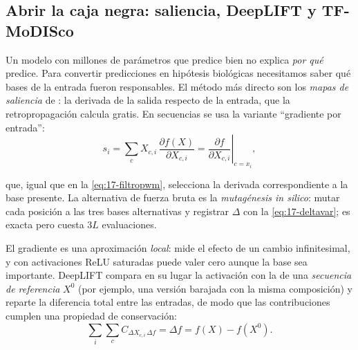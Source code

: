 \subsection{Abrir la caja negra: saliencia, DeepLIFT y TF-MoDISco}

Un modelo con millones de parámetros que predice bien no explica \emph{por qué} predice. Para convertir predicciones en hipótesis biológicas necesitamos saber qué bases de la entrada fueron responsables. El método más directo son los \emph{mapas de saliencia} de \textcite{c17-simonyan2013}: la derivada de la salida respecto de la entrada, que la retropropagación calcula gratis. En secuencias  se usa la variante ``gradiente por entrada'':
\begin{equation}\label{eq:17-saliencia}
s_i = \sum_{c} X_{c,i}\,\frac{\partial f(X)}{\partial X_{c,i}} = \left.\frac{\partial f}{\partial X_{c,i}}\right|_{c=x_i},
\end{equation}

\begin{simbolos}
\end{simbolos}

\noindent que, igual que en la \cref{eq:17-filtropwm}, selecciona la derivada correspondiente a la base presente. La alternativa de fuerza bruta es la \emph{mutagénesis in silico}: mutar cada posición a las tres bases alternativas y registrar $\Delta$ con la \cref{eq:17-deltavar}; es exacta pero cuesta $3L$ evaluaciones.

El gradiente es una aproximación \emph{local}: mide el efecto de un cambio infinitesimal, y con activaciones ReLU saturadas puede valer cero aunque la base sea importante. DeepLIFT \parencite{c17-shrikumar2017} compara en su lugar la activación con la de una \emph{secuencia de referencia} $X^0$ (por ejemplo, una versión barajada con la misma composición) y reparte la diferencia total entre las entradas, de modo que las contribuciones cumplen una propiedad de conservación:
\begin{equation}\label{eq:17-deeplift}
\sum_{i}\sum_c C_{\Delta X_{c,i}\,\Delta f} = \Delta f = f(X)-f(X^0).
\end{equation}

\begin{simbolos}
\end{simbolos}

